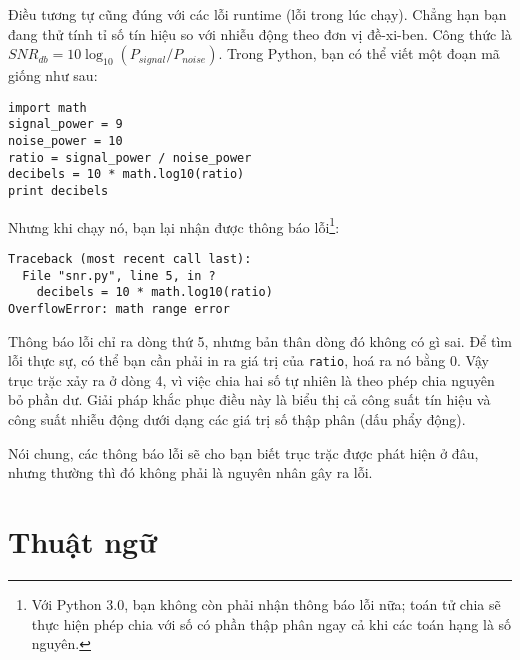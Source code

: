 \documentclass[11pt]{book}
\begin{document}

Điều tương tự cũng đúng với các lỗi runtime (lỗi trong lúc chạy).
Chẳng hạn bạn đang thử tính tỉ số tín hiệu so với nhiễu động theo 
đơn vị đề-xi-ben. Công thức là $SNR_{db} = 10 \log_{10} (P_{signal} / P_{noise})$.  
Trong Python, bạn có thể viết một đoạn mã giống như sau:

\beforeverb
\begin{verbatim}
import math
signal_power = 9
noise_power = 10
ratio = signal_power / noise_power
decibels = 10 * math.log10(ratio)
print decibels
\end{verbatim}
\afterverb
%
Nhưng khi chạy nó, bạn lại nhận được thông báo lỗi\footnote{Với Python 3.0,
bạn không còn phải nhận thông báo lỗi nữa; toán tử chia sẽ thực hiện phép 
chia với số có phần thập phân ngay cả khi các toán hạng là số nguyên.}:


\beforeverb
\begin{verbatim}
Traceback (most recent call last):
  File "snr.py", line 5, in ?
    decibels = 10 * math.log10(ratio)
OverflowError: math range error
\end{verbatim}
\afterverb
%
Thông báo lỗi chỉ ra dòng thứ 5, nhưng bản thân dòng đó không có gì sai.
Để tìm lỗi thực sự, có thể bạn cần phải in ra giá trị của {\tt ratio}, hoá ra
nó bằng 0. Vậy trục trặc xảy ra ở dòng 4, vì việc chia hai số tự nhiên 
là theo phép chia nguyên bỏ phần dư. Giải pháp khắc phục điều này là
biểu thị cả công suất tín hiệu và công suất nhiễu động dưới dạng các
giá trị số thập phân (dấu phẩy động).


Nói chung, các thông báo lỗi sẽ cho bạn biết trục trặc được phát hiện ở đâu,
nhưng thường thì đó không phải là nguyên nhân gây ra lỗi.


\section{Thuật ngữ}
\end{document}

